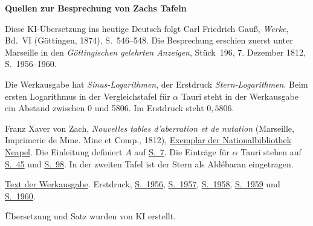 \clearpage\thispagestyle{empty}
\begin{center}\textbf{Quellen zur Besprechung von Zachs Tafeln}\end{center}
\noindent Diese KI-Übersetzung ins heutige Deutsch folgt Carl Friedrich Gauß, \textit{Werke}, Bd.~VI (Göttingen, 1874), S.~546--548. Die Besprechung erschien zuerst unter Marseille in den \textit{Göttingischen gelehrten Anzeigen}, Stück~196, 7. Dezember 1812, S.~1956--1960.
\par\smallskip\noindent Die Werkausgabe hat \textit{Sinus-Logarithmen}, der Erstdruck \textit{Stern-Logarithmen}. Beim ersten Logarithmus in der Vergleichstafel für \(\alpha\) Tauri steht in der Werkausgabe ein Abstand zwischen 0 und 5806. Im Erstdruck steht \(0{,}5806\).
\par\smallskip\noindent Franz Xaver von Zach, \textit{Nouvelles tables d'aberration et de nutation} (Marseille, Imprimerie de Mme. Mine et Comp., 1812), \href{https://archive.org/details/bub_gb_-oek6b4alfwC}{Exemplar der Nationalbibliothek Neapel}. Die Einleitung definiert \(A\) auf \href{https://archive.org/download/bub_gb_-oek6b4alfwC/bub_gb_-oek6b4alfwC.pdf#page=11}{S.~7}. Die Einträge für \(\alpha\) Tauri stehen auf \href{https://archive.org/download/bub_gb_-oek6b4alfwC/bub_gb_-oek6b4alfwC.pdf#page=105}{S.~45} und \href{https://archive.org/download/bub_gb_-oek6b4alfwC/bub_gb_-oek6b4alfwC.pdf#page=158}{S.~98}. In der zweiten Tafel ist der Stern als Aldébaran eingetragen.
\par\smallskip\noindent \href{https://gdz.sub.uni-goettingen.de/id/PPN236007467}{Text der Werkausgabe}. Erstdruck, \href{https://images.p.sub.uni-goettingen.de/iiif/image/gdz:PPN319721507_1812:00002000/full/1650,/0/default.jpg}{S.~1956}, \href{https://images.p.sub.uni-goettingen.de/iiif/image/gdz:PPN319721507_1812:00002001/full/1650,/0/default.jpg}{S.~1957}, \href{https://images.p.sub.uni-goettingen.de/iiif/image/gdz:PPN319721507_1812:00002002/full/1650,/0/default.jpg}{S.~1958}, \href{https://images.p.sub.uni-goettingen.de/iiif/image/gdz:PPN319721507_1812:00002003/full/1650,/0/default.jpg}{S.~1959} und \href{https://images.p.sub.uni-goettingen.de/iiif/image/gdz:PPN319721507_1812:00002004/full/1650,/0/default.jpg}{S.~1960}.
\par\smallskip\noindent Übersetzung und Satz wurden von KI erstellt.
\clearpage
